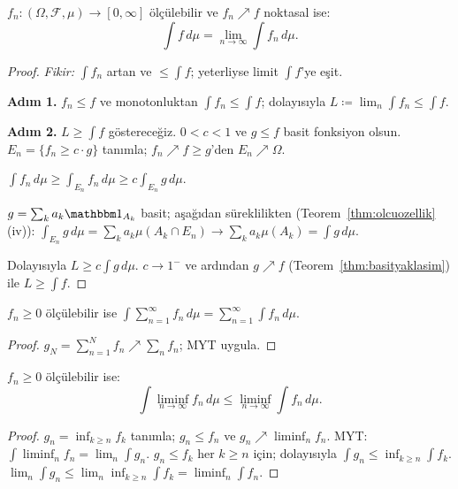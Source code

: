 \begin{teorem}\label{thm:myt}
$f_n: (\Omega,\mathcal{F},\mu) \to [0,\infty]$ ölçülebilir ve $f_n \nearrow f$
noktasal ise:
\[
  \int f \, d\mu = \lim_{n\to\infty} \int f_n \, d\mu.
\]
\end{teorem}

\begin{proof}
\textit{Fikir:} $\int f_n$ artan ve $\leq \int f$; yeterliyse limit $\int f$'ye eşit.

\medskip

\textbf{Adım 1.} $f_n \leq f$ ve monotonluktan $\int f_n \leq \int f$; dolayısıyla
$L \coloneqq \lim_n \int f_n \leq \int f$.

\textbf{Adım 2.} $L \geq \int f$ göstereceğiz. $0 < c < 1$ ve $g \leq f$ basit
fonksiyon olsun. $E_n = \{f_n \geq c \cdot g\}$ tanımla; $f_n \nearrow f \geq g$'den
$E_n \nearrow \Omega$.

$\int f_n \, d\mu \geq \int_{E_n} f_n \, d\mu \geq c \int_{E_n} g \, d\mu$.

$g = \sum_k a_k \gostf{A_k}$ basit; aşağıdan süreklilikten (Teorem~\ref{thm:olcuozellik}(iv)):
$\int_{E_n} g \, d\mu = \sum_k a_k \mu(A_k \cap E_n) \to \sum_k a_k \mu(A_k) = \int g \, d\mu$.

Dolayısıyla $L \geq c \int g \, d\mu$. $c \to 1^-$ ve ardından
$g \nearrow f$ (Teorem~\ref{thm:basityaklasim}) ile $L \geq \int f$.
\end{proof}

\begin{sonuc}\label{cor:mytseriler}
$f_n \geq 0$ ölçülebilir ise $\int \sum_{n=1}^\infty f_n \, d\mu = \sum_{n=1}^\infty \int f_n \, d\mu$.
\end{sonuc}

\begin{proof}
$g_N = \sum_{n=1}^N f_n \nearrow \sum_n f_n$; MYT uygula.
\end{proof}

\begin{teorem}\label{thm:fatou}
$f_n \geq 0$ ölçülebilir ise:
\[
  \int \liminf_{n\to\infty} f_n \, d\mu \leq \liminf_{n\to\infty} \int f_n \, d\mu.
\]
\end{teorem}

\begin{proof}
$g_n = \inf_{k \geq n} f_k$ tanımla; $g_n \leq f_n$ ve $g_n \nearrow \liminf_n f_n$.
MYT: $\int \liminf_n f_n = \lim_n \int g_n$.
$g_n \leq f_k$ her $k \geq n$ için; dolayısıyla
$\int g_n \leq \inf_{k \geq n} \int f_k$.
$\lim_n \int g_n \leq \lim_n \inf_{k \geq n} \int f_k = \liminf_n \int f_n$.
\end{proof}

